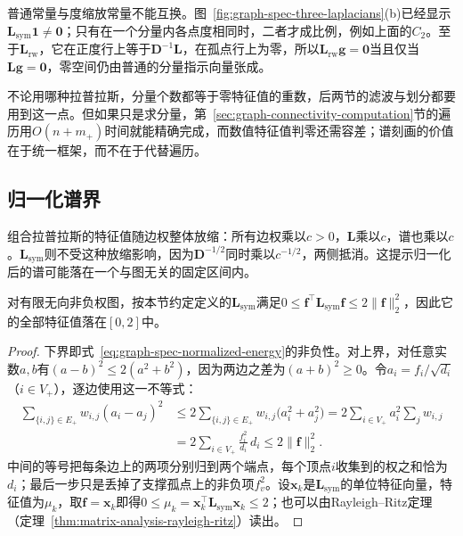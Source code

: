 普通常量与度缩放常量不能互换。图~\ref{fig:graph-spec-three-laplacians}(b)已经显示$\bm L_{\mathrm{sym}}\bm1\neq\bm0$；只有在一个分量内各点度相同时，二者才成比例，例如上面的$C_2$。至于$\bm L_{\mathrm{rw}}$，它在正度行上等于$\bm D^{-1}\bm L$，在孤点行上为零，所以$\bm L_{\mathrm{rw}}\bm g=\bm0$当且仅当$\bm L\bm g=\bm0$，零空间仍由普通的分量指示向量张成。

不论用哪种拉普拉斯，分量个数都等于零特征值的重数，后两节的滤波与划分都要用到这一点。但如果只是求分量，第~\ref{sec:graph-connectivity-computation}节的遍历用$O(n+m_+)$时间就能精确完成，而数值特征值判零还需容差；谱刻画的价值在于统一框架，而不在于代替遍历。

\subsection{归一化谱界}
\label{sec:graph-spec-normalized-bound}

组合拉普拉斯的特征值随边权整体放缩：所有边权乘以$c>0$，$\bm L$乘以$c$，谱也乘以$c$。$\bm L_{\mathrm{sym}}$则不受这种放缩影响，因为$\bm D^{-1/2}$同时乘以$c^{-1/2}$，两侧抵消。这提示归一化后的谱可能落在一个与图无关的固定区间内。

\begin{theorem}[归一化谱界]
\label{thm:graph-spec-normalized-bound}
对有限无向非负权图，按本节约定定义的$\bm L_{\mathrm{sym}}$满足$0\leq\bm f^{\top}\bm L_{\mathrm{sym}}\bm f\leq2\lVert\bm f\rVert_2^2$，因此它的全部特征值落在$[0,2]$中。
\end{theorem}

\begin{proof}
下界即式~\eqref{eq:graph-spec-normalized-energy}的非负性。对上界，对任意实数$a,b$有$(a-b)^2\leq2(a^2+b^2)$，因为两边之差为$(a+b)^2\geq0$。令$a_i=f_i/\sqrt{d_i}$（$i\in V_+$），逐边使用这一不等式：
\[
 \begin{aligned}
 \sum_{\{i,j\}\in E_+}w_{i,j}(a_i-a_j)^2
 &\leq2\sum_{\{i,j\}\in E_+}w_{i,j}\bigl(a_i^2+a_j^2\bigr)
 =2\sum_{i\in V_+}a_i^2\sum_jw_{i,j}\\
 &=2\sum_{i\in V_+}\frac{f_i^2}{d_i}\,d_i\leq2\lVert\bm f\rVert_2^2 .
 \end{aligned}
\]
中间的等号把每条边上的两项分别归到两个端点，每个顶点$i$收集到的权之和恰为$d_i$；最后一步只是丢掉了支撑孤点上的非负项$f_v^2$。设$\bm x_k$是$\bm L_{\mathrm{sym}}$的单位特征向量，特征值为$\mu_k$，取$\bm f=\bm x_k$即得$0\leq\mu_k=\bm x_k^{\top}\bm L_{\mathrm{sym}}\bm x_k\leq2$；也可以由Rayleigh--Ritz定理（定理~\ref{thm:matrix-analysis-rayleigh-ritz}）读出。
\end{proof}

